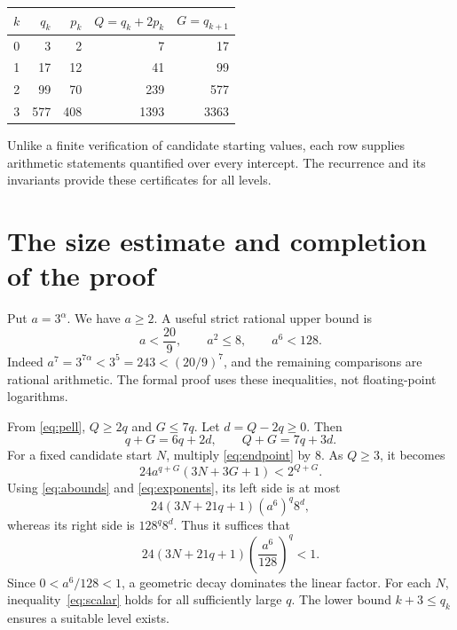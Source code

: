 \documentclass[11pt]{article}
\theoremstyle{remark}
\begin{document}
\begin{center}
\begin{tabular}{rrrrr}
\toprule
$k$ & $q_k$ & $p_k$ & $Q=q_k+2p_k$ & $G=q_{k+1}$\\
\midrule
0 & 3 & 2 & 7 & 17\\
1 & 17 & 12 & 41 & 99\\
2 & 99 & 70 & 239 & 577\\
3 & 577 & 408 & 1393 & 3363\\
\bottomrule
\end{tabular}
\end{center}
Unlike a finite verification of candidate starting values, each row
supplies arithmetic statements quantified over every intercept. The
recurrence and its invariants provide these certificates for all levels.

\section{The size estimate and completion of the proof}
Put $a=3^\alpha$. We have $a\ge2$. A useful strict rational upper bound is
\begin{equation}\label{eq:abounds}
a<\frac{20}{9},\qquad a^2\le8,\qquad a^6<128.
\end{equation}
Indeed $a^7=3^{7\alpha}<3^5=243<(20/9)^7$, and the remaining comparisons
are rational arithmetic. The formal proof uses these inequalities,
not floating-point logarithms.

From \eqref{eq:pell}, $Q\ge2q$ and $G\le7q$. Let $d=Q-2q\ge0$. Then
\begin{equation}\label{eq:exponents}
q+G=6q+2d,\qquad Q+G=7q+3d.
\end{equation}
For a fixed candidate start $N$, multiply \eqref{eq:endpoint} by $8$.
As $Q\ge3$, it becomes
\begin{equation}\label{eq:multiplied}
24a^{q+G}(3N+3G+1)<2^{Q+G}.
\end{equation}
Using \eqref{eq:abounds} and \eqref{eq:exponents}, its left side is at most
\[
24(3N+21q+1)(a^6)^q8^d,
\]
whereas its right side is $128^q8^d$. Thus it suffices that
\begin{equation}\label{eq:scalar}
24(3N+21q+1)\left(\frac{a^6}{128}\right)^q<1.
\end{equation}
Since $0<a^6/128<1$, a geometric decay dominates the linear factor.
For each $N$, inequality~\eqref{eq:scalar} holds for all sufficiently
large $q$. The lower bound $k+3\le q_k$ ensures a suitable level exists.
\end{document}
